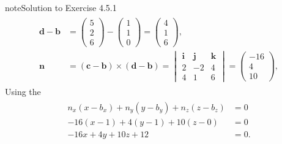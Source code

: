 \documentclass[letterpaper,10pt,english]{jupyterBook}
\begin{document}
\begin{sphinxadmonition}{note}{Solution to Exercise 4.5.1}
\begin{equation*}
\begin{split}
\begin{align*}
    \mathbf{d} - \mathbf{b} &= \begin{pmatrix} 5 \\ 2 \\ 6 \end{pmatrix} -
    \begin{pmatrix} 1 \\ 1 \\ 0 \end{pmatrix} =
    \begin{pmatrix} 4 \\ 1 \\ 6 \end{pmatrix}, \\
    \mathbf{n} &= (\mathbf{c} - \mathbf{b}) \times (\mathbf{d} - \mathbf{b}) = 
    \begin{vmatrix}
        \mathbf{i} & \mathbf{j} & \mathbf{k} \\
        2 & -2 & 4 \\
        4 & 1 & 6
    \end{vmatrix} =
    \begin{pmatrix} -16 \\ 4 \\ 10 \end{pmatrix},
\end{align*} \end{split}
\end{equation*}
\sphinxAtStartPar
Using the {\hyperref[\detokenize{_pages/4.2_Planes:point-normal-definition}]{}}
\begin{equation*}
\begin{split} \begin{align*}
    n_x(x - b_x) + n_y(y - b_y) + n_z(z - b_z) &= 0 \\
    -16(x - 1) + 4(y - 1) + 10(z - 0) &= 0\\
    -16 x + 4 y + 10 z + 12 &= 0.
\end{align*} \end{split}
\end{equation*}\end{sphinxadmonition}
 \label{_pages/A4_Coordinate_geometry_exercises_solutions:_pages/A4_Coordinate_geometry_exercises_solutions-solution-1}
\end{document}
